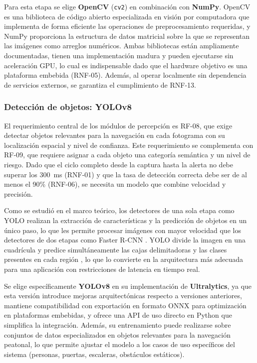 Para esta etapa se elige \textbf{OpenCV} (\texttt{cv2}) en combinación con
\textbf{NumPy}. OpenCV es una biblioteca de código abierto especializada en visión por
computadora que implementa de forma eficiente las operaciones de preprocesamiento
requeridas, y NumPy proporciona la estructura de datos matricial sobre la que se
representan las imágenes como arreglos numéricos. Ambas bibliotecas están ampliamente
documentadas, tienen una implementación madura y pueden ejecutarse sin aceleración GPU,
lo cual es indispensable dado que el hardware objetivo es una plataforma embebida
(RNF-05). Además, al operar localmente sin dependencia de servicios externos, se
garantiza el cumplimiento de RNF-13.

\subsubsection{Detección de objetos: YOLOv8}

El requerimiento central de los módulos de percepción es RF-08, que exige detectar
objetos relevantes para la navegación en cada fotograma con su localización espacial y
nivel de confianza. Este requerimiento se complementa con RF-09, que requiere asignar
a cada objeto una categoría semántica y un nivel de riesgo. Dado que el ciclo completo
desde la captura hasta la alerta no debe superar los 300~ms (RNF-01) y que la tasa de
detección correcta debe ser de al menos el 90\% (RNF-06), se necesita un modelo que
combine velocidad y precisión.

Como se estudió en el marco teórico, los detectores de una sola etapa como YOLO realizan
la extracción de características y la predicción de objetos en un único paso, lo que les
permite procesar imágenes con mayor velocidad que los detectores de dos etapas como
Faster R-CNN \cite{geeksforgeeks_object_detection}. YOLO divide la imagen en una
cuadrícula y predice simultáneamente las cajas delimitadoras y las clases presentes en
cada región \cite{geeksforgeeks_object_detection}, lo que lo convierte en la arquitectura
más adecuada para una aplicación con restricciones de latencia en tiempo real.

Se elige específicamente \textbf{YOLOv8} en su implementación de \textbf{Ultralytics},
ya que esta versión introduce mejoras arquitectónicas respecto a versiones anteriores,
mantiene compatibilidad con exportación en formato ONNX para optimización en plataformas
embebidas, y ofrece una API de uso directo en Python que simplifica la integración.
Además, su entrenamiento puede realizarse sobre conjuntos de datos especializados en
objetos relevantes para la navegación peatonal, lo que permite ajustar el modelo a los
casos de uso específicos del sistema (personas, puertas, escaleras, obstáculos estáticos).

